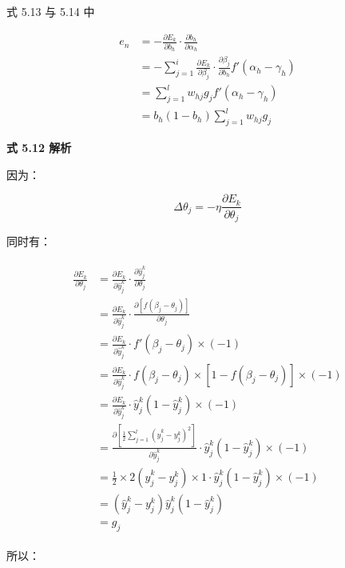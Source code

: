 \documentclass[../studies-ml.tex]{subfiles}
\begin{document}
式 5.13 与 5.14 中

\begin{equation}
  \begin{split}
    e_n & = -\frac{\partial E_k}{\partial b_h} \cdot \frac{\partial b_h}{\partial \alpha_h} \\
    & = -\sum_{j=1}^{i} \frac{\partial E_k}{\partial \beta_j} \cdot \frac{\partial \beta_j}{\partial b_h} f'(\alpha_h - \gamma_h) \\
    & = \sum_{j=1}^{l} w_{hj} g_j f'(\alpha_h - \gamma_h) \\
    & = b_h (1 - b_h) \sum_{j=1}^{l} w_{hj} g_j
  \end{split}
\end{equation}

\bigbreak
\textbf{式 5.12 解析}

因为：

\[
  \Delta \theta_j = -\eta \frac{\partial E_k}{\partial \theta_j}
\]

同时有：

\begin{align*}
  \begin{split}
    \frac{\partial E_k}{\partial \theta_j} & = \frac{\partial E_k}{\partial \hat{y}_j^k} \cdot
    \frac{\partial \hat{y}_j^k}{\partial \theta_j} \\
    & = \frac{\partial E_k}{\partial \hat{y}_j^k} \cdot
    \frac{\partial [f(\beta_j - \theta_j)]}{\partial \theta_j} \\
    & = \frac{\partial E_k}{\partial \hat{y}_j^k} \cdot
    f'(\beta_j - \theta_j) \times (-1) \\
    & = \frac{\partial E_k}{\partial \hat{y}_j^k} \cdot
    f(\beta_j - \theta_j) \times [1 - f(\beta_j - \theta_j)] \times (-1) \\
    & = \frac{\partial E_k}{\partial \hat{y}_j^k} \cdot
    \hat{y}_j^k (1 - \hat{y}_j^k) \times (-1) \\
    & = \frac{\partial [\frac{1}{2} \sum_{j=1}^{l} (\hat{y}_j^k - y_j^k)^2]}{\partial \hat{y}_j^k} \cdot
    \hat{y}_j^k (1 - \hat{y}_j^k) \times (-1) \\
    & = \frac{1}{2} \times 2(\hat{y}_j^k - y_j^k) \times 1 \cdot \hat{y}_j^k (1 - \hat{y}_j^k) \times (-1) \\
    & = (\hat{y}_j^k - y_j^k) \hat{y}_j^k (1 - \hat{y}_j^k) \\
    & = g_j
  \end{split}
\end{align*}

所以：
\end{document}
